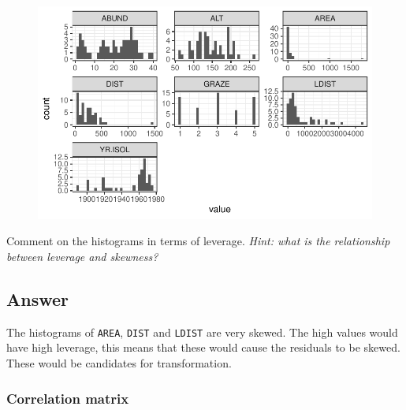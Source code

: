 \documentclass[
  10pt,
  letterpaper,
  DIV=11,
  numbers=noendperiod]{scrartcl}
\begin{document}
\begin{figure}[H]

{\centering \includegraphics{ENVX2001-2024-Lab07_files/figure-pdf/unnamed-chunk-5-1.pdf}

}

\end{figure}

\begin{tcolorbox}[enhanced jigsaw, rightrule=.15mm, coltitle=black, leftrule=.75mm, titlerule=0mm, breakable, toprule=.15mm, bottomtitle=1mm, colback=white, toptitle=1mm, opacitybacktitle=0.6, bottomrule=.15mm, arc=.35mm, left=2mm, title=\textcolor{quarto-callout-warning-color}{\faExclamationTriangle}\hspace{0.5em}{Question 1}, colbacktitle=quarto-callout-warning-color!10!white, opacityback=0, colframe=quarto-callout-warning-color-frame]

Comment on the histograms in terms of leverage. \emph{Hint: what is the
relationship between leverage and skewness?}

\end{tcolorbox}

\hypertarget{answer}{%
\subsection{Answer}\label{answer}}

The histograms of \texttt{AREA}, \texttt{DIST} and \texttt{LDIST} are
very skewed. The high values would have high leverage, this means that
these would cause the residuals to be skewed. These would be candidates
for transformation.

\hypertarget{correlation-matrix}{%
\subsubsection{Correlation matrix}\label{correlation-matrix}}
\end{document}
